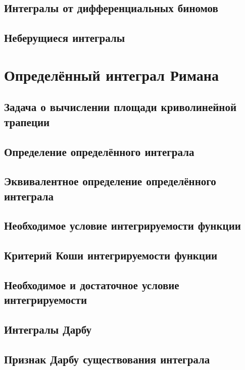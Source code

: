 \subsection{Интегралы от дифференциальных биномов}
 
\subsection{Неберущиеся интегралы}


\section{Определённый интеграл Римана}
\subsection{Задача о вычислении площади криволинейной трапеции}

\subsection{Определение определённого интеграла}

\subsection{Эквивалентное определение определённого интеграла}

\subsection{Необходимое условие интегрируемости функции}

\subsection{Критерий Коши интегрируемости функции}
\subsection{Необходимое и достаточное условие интегрируемости}
\subsection{Интегралы Дарбу}
\subsection{Признак Дарбу существования интеграла}
